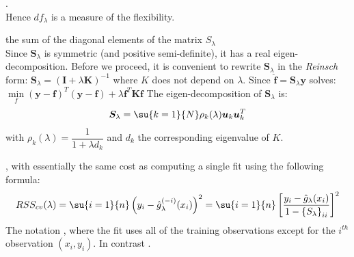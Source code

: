 .\\
Hence $df_{\lambda}$ is a measure of the flexibility.
\begin{center}
\end{center}
the sum of the diagonal elements of the matrix $S_{\lambda}$\\
Since $\bm{S}_{\lambda}$ is symmetric (and positive semi-definite), it has a real 
eigen-decomposition. Before we proceed, it is convenient to rewrite $\bm{S}_{\lambda}$ in the
\textit{Reinsch} form: $\bm{S}_{\lambda} = \left(\bm{I}+\lambda\bm{K}\right)^{-1}$ where $K$
does not depend on $\lambda$. Since $\hat{\bm{f}}=\bm{S}_{\lambda}\bm{y}$ solves: 
$\min\limits_{f}(\bm{y}-\bm{f})^{T}(\bm{y}-\bm{f})+\lambda\bm{f}^{T}\bm{K}\bm{f}$
The eigen-decomposition of $\bm{S}_{\lambda}$ is:
$$ \bm{S}_{\lambda}=\su{{k=1}}{N}\rho_{k}(\lambda)\bm{u}_{k}\bm{u}_{k}^{T}$$ with 
$\rho_{k}(\lambda)=\dfrac{1}{1+\lambda d_{k}}$ and $d_{k}$ the corresponding eigenvalue of $K$.

, with
essentially the same cost as computing a single fit using the following
formula:
$$
RSS_{cv}(\lambda)=\su{{i=1}}{n}\left( y_{i}-\hat{g}_{\lambda}^{(-i)}(x_{i}) \right)^{2}=\su{{i=1}}{n}\left[ \dfrac{y_{i}-\hat{g}_{\lambda}(x_{i})}{1-\left\{ S_{\lambda} \right\}_{ii}} \right]^{2}
$$
The notation , where the fit
uses all of the training observations except for the $i^{th}$
observation $(x_{i},y_{i})$. In contrast .

